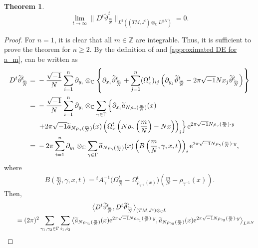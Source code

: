\documentclass[10pt,a4paper]{amsart}
\numberwithin{equation}{section}
\newtheorem{Theorem}{Theorem}[section]
\newcommand{\C}{\mathbb{C}}
\newcommand{\Z}{\mathbb{Z}}
\renewcommand{\tilde}{\widetilde}
\begin{document}
\begin{Theorem}\label{main5}
\begin{equation*}
\lim_{t\to \infty}\big\|D^t {\tilde \vartheta}^t_{\frac{m}{N}}\big\|_{L^2((TM, J^t)\otimes_{\C}L^{\otimes N})}=0.
\end{equation*}
\end{Theorem}

\begin{proof}%
For $n=1$, it is clear that all $m\in \Z$ are integrable. Thus, it is sufficient to prove the theorem for $n\ge 2$. By the definition of \smash{${\tilde \vartheta}^t_{\frac{m}{N}}$} and \eqref{approximated DE for a_m}, \smash{$D^t {\tilde \vartheta}^t_{\frac{m}{N}}$} can be written as
\begin{align*}
D^t {\tilde \vartheta}^t_{\frac{m}{N}}
={}&-\frac{\sqrt{-1}}{N}\sum_{i=1}^n\partial_{y_i}\otimes_{\C}\left\{\partial_{x_i}{\tilde \vartheta}^t_{\frac{m}{N}}+\sum_{j=1}^n(\Omega^t_x)_{ij}\left(\partial_{y_j}{\tilde \vartheta}^t_{\frac{m}{N}}-2\pi\sqrt{-1}Nx_j {\tilde \vartheta}^t_{\frac{m}{N}}\right)\right\} \\
={}&-\frac{\sqrt{-1}}{N}\sum_{i=1}^n\partial_{y_i}\otimes_{\C}\sum_{\gamma \in \Gamma}\left\{\partial_{x_i}{\tilde a}_{N\rho_\gamma (\frac{m}{N})}(x)\right.\\
&\left. +2\pi\sqrt{-1}{\tilde a}_{N\rho_\gamma (\frac{m}{N})}(x) \left(\Omega^t_x \left( N\rho_{\gamma}\left(\frac{m}{N}\right)-Nx\right)\right)_i \right\} {\rm e}^{2\pi\sqrt{-1}N\rho_\gamma (\frac{m}{N})\cdot y} \\
={}&-2\pi \sum_{i=1}^n\partial_{y_i}\otimes_{\C}\sum_{\gamma \in \Gamma}{\tilde a}_{N\rho_\gamma (\frac{m}{N})}(x)\left( B\left(\frac{m}{N},\gamma, x,t\right)\right)_i {\rm e}^{2\pi\sqrt{-1}N\rho_\gamma (\frac{m}{N})\cdot y},
\end{align*}
where
\begin{align*}
B\left(\frac{m}{N}, \gamma ,x,t\right)={}^tA_{\gamma}^{-1}\bigl( \Omega^t_{\frac{m}{N}}-\Omega^t_{\rho_{\gamma^{-1}}(x)}\bigr)\left(\frac{m}{N}-\rho_{\gamma^{-1}}(x)\right).
\end{align*}
Then,
\begin{gather*}
\big\langle D^t {\tilde \vartheta}^t_{\frac{m}{N}} ,D^t {\tilde \vartheta}^t_{\frac{m}{N}} \big\rangle_{(TM, J^t)\otimes_{\C}L}\\
\qquad=(2\pi)^2\sum_{\gamma_1, \gamma_2 \in \Gamma}\sum_{i_1, i_2}\big\langle {\tilde a}_{N\rho_{\gamma_1} (\frac{m}{N})}(x){\rm e}^{2\pi\sqrt{-1}N\rho_{\gamma_1} (\frac{m}{N})\cdot y}, {\tilde a}_{N\rho_{\gamma_2} (\frac{m}{N})}(x){\rm e}^{2\pi\sqrt{-1}N\rho_{\gamma_2} (\frac{m}{N})\cdot y}\big\rangle_{L^{\otimes N}}\\

\end{gather*}
\end{proof}
\end{document}
